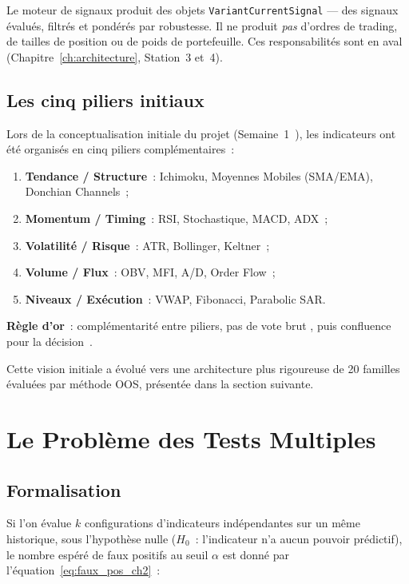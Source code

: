 Le moteur de signaux produit des objets \texttt{VariantCurrentSignal} — des signaux
évalués, filtrés et pondérés par robustesse. Il ne produit \emph{pas} d'ordres de
trading, de tailles de position ou de poids de portefeuille. Ces responsabilités
sont en aval (Chapitre~\ref{ch:architecture}, Station~3 et~4).

\subsection{Les cinq piliers initiaux}

Lors de la conceptualisation initiale du projet (Semaine~1~\cite{rapport_s1}), les
indicateurs ont été organisés en cinq piliers complémentaires~:

\begin{enumerate}
    \item \textbf{Tendance / Structure}~: Ichimoku, Moyennes Mobiles (SMA/EMA),
    Donchian Channels~;
    \item \textbf{Momentum / Timing}~: RSI, Stochastique, MACD, ADX~;
    \item \textbf{Volatilité / Risque}~: ATR, Bollinger, Keltner~;
    \item \textbf{Volume / Flux}~: OBV, MFI, A/D, Order Flow~;
    \item \textbf{Niveaux / Exécution}~: VWAP, Fibonacci, Parabolic SAR.
\end{enumerate}

\textbf{Règle d'or}~: complémentarité entre piliers, pas de \og vote brut \fg{},
puis confluence pour la décision~\cite{rapport_s1}.

\medskip

Cette vision initiale a évolué vers une architecture plus rigoureuse de 20 familles
évaluées par méthode OOS, présentée dans la section suivante.

\section{Le Problème des Tests Multiples}
\label{sec:tests_multiples}

\subsection{Formalisation}

Si l'on évalue $k$ configurations d'indicateurs indépendantes sur un même historique,
sous l'hypothèse nulle ($H_0$~: l'indicateur n'a aucun pouvoir prédictif), le nombre
espéré de faux positifs au seuil $\alpha$ est donné par l'équation~\eqref{eq:faux_pos_ch2}~:

